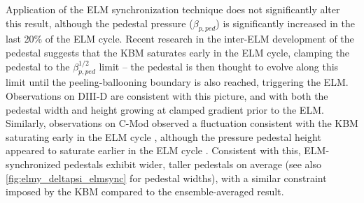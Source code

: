 \begin{figure}[ht]
 \pushtooutside
\end{figure}

Application of the ELM synchronization technique does not significantly alter this result, although the pedestal pressure (\ie $\beta_{p,ped}$) is significantly increased in the last 20\% of the ELM cycle.  Recent research in the inter-ELM development of the pedestal suggests that the KBM saturates early in the ELM cycle, clamping the pedestal to the $\beta_{p,ped}^{1/2}$ limit -- the pedestal is then thought to evolve along this limit until the peeling-ballooning boundary is also reached, triggering the ELM.  Observations on DIII-D \cite{Snyder2012} are consistent with this picture, and with both the pedestal width and height growing at clamped gradient prior to the ELM.  Similarly, observations on C-Mod observed a fluctuation consistent with the KBM saturating early in the ELM cycle \cite{Diallo2014}, although the pressure pedestal height appeared to saturate earlier in the ELM cycle \cite{Hughes2013}.  Consistent with this, ELM-synchronized pedestals exhibit wider, taller pedestals on average (see also \cref{fig:elmy_deltapsi_elmsync} for pedestal widths), with a similar constraint imposed by the KBM compared to the ensemble-averaged result.  

